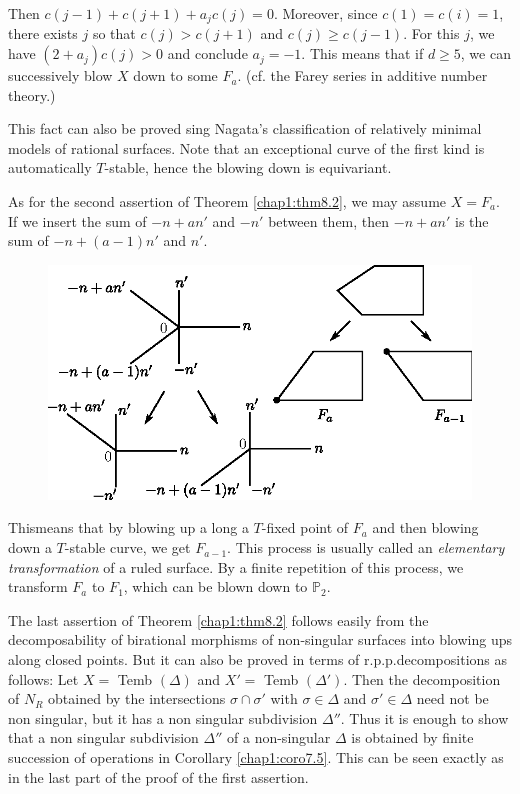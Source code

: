 Then  $ c(j-1) + c(j+1) + a_jc(j) = 0 $. Moreover, since $c (1) = c(i)
= 1$, there exists $j$ so that  $c (j)>c(j+1)$ and $c (j)\geq
c(j-1)$. For this  $j$, we have   $(2 +a_j) c (j) >0$ and conclude
$a_j = -1$. This means that if  $d \geq 5$, we can successively blow
$X$ down to some $F_a$. (cf. the Farey series in additive number
theory.)  

This  fact can  also be proved sing Nagata's classification  \cite{keyN1}
of relatively minimal models of rational surfaces. Note that an
exceptional curve of the first kind is automatically  $T$-stable,
hence the blowing down is equivariant. 

As for the  second assertion  of Theorem \ref{chap1:thm8.2}, we may assume  $X =
F_a$. If we insert the sum of  $-n +an'$ and  $-n'$ between them, then
$-n +an'$  is the sum of  $-n + (a-1)n'$ and  $n'$. 
\begin{figure}[H]
\centering 
\includegraphics{vol58-fig/fig58-17.eps} 
\end{figure}


This\pageoriginale means that by blowing up a long a  $T$-fixed point
of $F_a$ and 
then blowing down a $T$-stable  curve, we get $F_{a-1}$. This  process
is usually called an \textit{elementary transformation} of a ruled
surface. By a finite repetition of this process, we transform  $F_a$
to $F_1$, which can be blown  down to $\mathbb{P}_2$. 

The  last assertion of Theorem \ref{chap1:thm8.2} follows  easily from the
decomposability of birational morphisms of non-singular surfaces
into blowing ups along closed points. But it can also be proved in
terms of r.p.p.decompositions as follows: Let $X =$ Temb $(\Delta)$
and  $X' = $ Temb $(\Delta') $. Then the decomposition of $N_R$ 
obtained by the  intersections  $\sigma \cap \sigma'$ with $\sigma \in
\Delta$ and $\sigma' \in \Delta$ need not be non singular, but  it has
a non singular subdivision $\Delta''$. Thus it is enough to show  that
a non singular subdivision $\Delta''$ of a non-singular $\Delta$ is
obtained by  finite succession of operations in  Corollary
\ref{chap1:coro7.5}. This 
can be seen exactly as in the last part of the proof of the first
assertion. 

